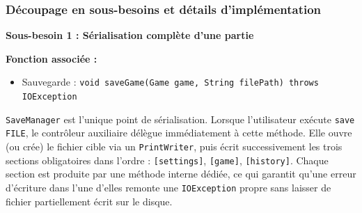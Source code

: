 \documentclass[a4paper]{article}
\begin{document}
\subsubsection{Découpage en sous-besoins et détails d'implémentation}

\begin{besoinbox}
    \textbf{\large Sous-besoin 1 : Sérialisation complète d'une partie}

    \vspace{2mm}
    \textbf{Fonction associée :}
    \begin{itemize}
        \item Sauvegarde : \texttt{void saveGame(Game game, String filePath) throws IOException}
    \end{itemize}
    \vspace{2mm}

    \texttt{SaveManager} est l'unique point de sérialisation. Lorsque l'utilisateur exécute \texttt{save FILE}, le contrôleur auxiliaire délègue immédiatement à cette méthode. Elle ouvre (ou crée) le fichier cible via un \texttt{PrintWriter}, puis écrit successivement les trois sections obligatoires dans l'ordre : \texttt{[settings]}, \texttt{[game]}, \texttt{[history]}. Chaque section est produite par une méthode interne dédiée, ce qui garantit qu'une erreur d'écriture dans l'une d'elles remonte une \texttt{IOException} propre sans laisser de fichier partiellement écrit sur le disque.
\end{besoinbox}
\end{document}
